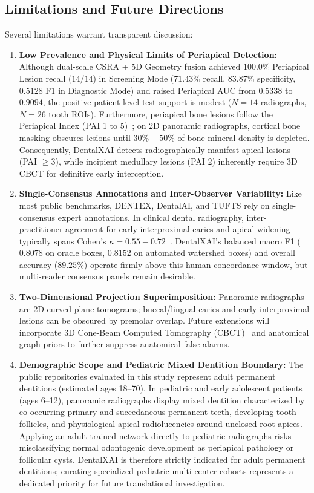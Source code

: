 \documentclass[review]{elsarticle}
\begin{document}
\subsection{Limitations and Future Directions}
Several limitations warrant transparent discussion:
\begin{enumerate}
    \item \textbf{Low Prevalence and Physical Limits of Periapical Detection:} Although dual-scale CSRA + 5D Geometry fusion achieved $100.0\%$ Periapical Lesion recall ($14/14$) in Screening Mode ($71.43\%$ recall, $83.87\%$ specificity, $0.5128$ F1 in Diagnostic Mode) and raised Periapical AUC from $0.5338$ to $0.9094$, the positive patient-level test support is modest ($N=14$ radiographs, $N=26$ tooth ROIs). Furthermore, periapical bone lesions follow the Periapical Index (PAI 1 to 5)~\cite{orstavik1986periapical}; on 2D panoramic radiographs, cortical bone masking obscures lesions until $30\% - 50\%$ of bone mineral density is depleted. Consequently, DentalXAI detects radiographically manifest apical lesions (PAI $\ge 3$), while incipient medullary lesions (PAI 2) inherently require 3D CBCT for definitive early interception.
    \item \textbf{Single-Consensus Annotations and Inter-Observer Variability:} Like most public benchmarks, DENTEX, DentalAI, and TUFTS rely on single-consensus expert annotations. In clinical dental radiography, inter-practitioner agreement for early interproximal caries and apical widening typically spans Cohen's $\kappa = 0.55 - 0.72$~\cite{schwendicke2019convolutional}. DentalXAI's balanced macro F1 ($0.8078$ on oracle boxes, $0.8152$ on automated watershed boxes) and overall accuracy ($89.25\%$) operate firmly above this human concordance window, but multi-reader consensus panels remain desirable.
    \item \textbf{Two-Dimensional Projection Superimposition:} Panoramic radiographs are 2D curved-plane tomograms; buccal/lingual caries and early interproximal lesions can be obscured by premolar overlap. Future extensions will incorporate 3D Cone-Beam Computed Tomography (CBCT)~\cite{jacobs2018cbct} and anatomical graph priors to further suppress anatomical false alarms.
    \item \textbf{Demographic Scope and Pediatric Mixed Dentition Boundary:} The public repositories evaluated in this study represent adult permanent dentitions (estimated ages 18--70). In pediatric and early adolescent patients (ages 6--12), panoramic radiographs display mixed dentition characterized by co-occurring primary and succedaneous permanent teeth, developing tooth follicles, and physiological apical radiolucencies around unclosed root apices. Applying an adult-trained network directly to pediatric radiographs risks misclassifying normal odontogenic development as periapical pathology or follicular cysts. DentalXAI is therefore strictly indicated for adult permanent dentitions; curating specialized pediatric multi-center cohorts represents a dedicated priority for future translational investigation.
\end{enumerate}
\end{document}
